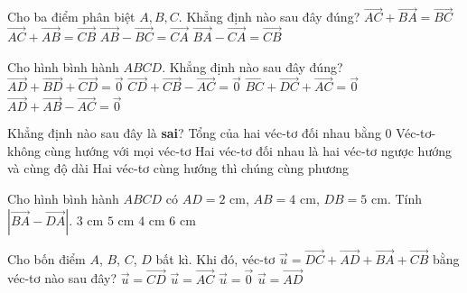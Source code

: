 \begin{ex}%
	Cho ba điểm phân biệt $A, B, C$. Khẳng định nào sau đây đúng?
	\choice
	{\True $\overrightarrow{AC}+\overrightarrow{BA}=\overrightarrow{BC}$}
	{$\overrightarrow{AC}+\overrightarrow{AB}=\overrightarrow{CB}$}
	{$\overrightarrow{AB}-\overrightarrow{BC}=\overrightarrow{CA}$}
	{$\overrightarrow{BA}-\overrightarrow{CA}=\overrightarrow{CB}$}
\end{ex}

\begin{ex}%
	Cho hình bình hành $ABCD$. Khẳng định nào sau đây đúng?
	\choice
	{$\overrightarrow{AD}+\overrightarrow{BD}+\overrightarrow{CD}=\overrightarrow{0}$}
	{$\overrightarrow{CD}+\overrightarrow{CB}-\overrightarrow{AC}=\overrightarrow{0}$}
	{$\overrightarrow{BC}+\overrightarrow{DC}+\overrightarrow{AC}=\overrightarrow{0}$}
	{\True $\overrightarrow{AD}+\overrightarrow{AB}-\overrightarrow{AC}=\overrightarrow{0}$}
\end{ex}

\begin{ex}%
	Khẳng định nào sau đây là {\bf sai}?
	\choice
	{\True Tổng của hai véc-tơ đối nhau bằng 0}
	{Véc-tơ-không cùng hướng với mọi véc-tơ}
	{Hai véc-tơ đối nhau là hai véc-tơ ngược hướng và cùng độ dài}
	{Hai véc-tơ cùng hướng thì chúng cùng phương}
\end{ex}

\begin{ex}%
	Cho hình bình hành $ABCD$ có $AD=2$ cm, $AB=4$ cm, $DB=5$ cm. Tính $\left|\overrightarrow{BA}-\overrightarrow{DA} \right| $.
	\choice
	{$3$ cm}
	{\True $5$ cm}
	{$4$ cm}
	{$6$ cm}
\end{ex}

\begin{ex}%
	Cho bốn điểm $A$, $B$, $C$, $D$ bất kì. Khi đó, véc-tơ $\overrightarrow{u}=\overrightarrow{DC}+\overrightarrow{AD}+\overrightarrow{BA}+\overrightarrow{CB}$ bằng véc-tơ nào sau đây?
	\choice
	{$\overrightarrow{u}=\overrightarrow{CD}$}
	{$\overrightarrow{u}=\overrightarrow{AC}$}
	{\True $\overrightarrow{u}=\overrightarrow{0}$}
	{$\overrightarrow{u}=\overrightarrow{AD}$}
\end{ex}

